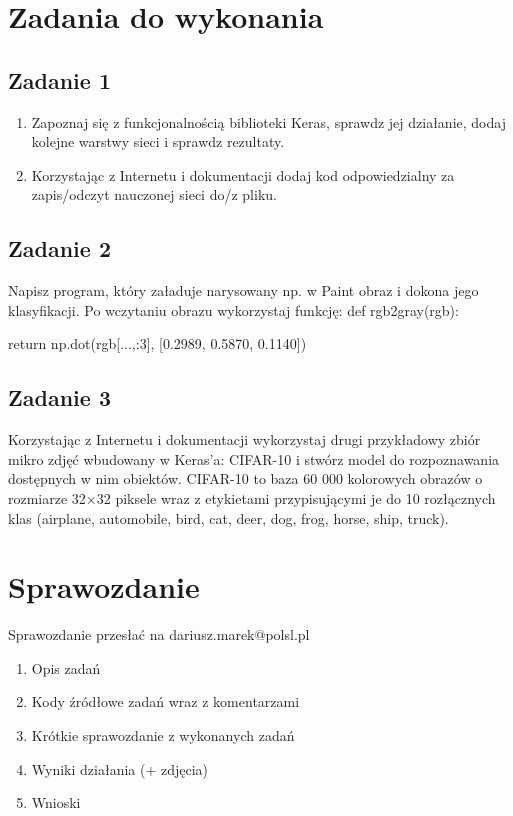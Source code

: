 \documentclass[12pt]{article}
\begin{document}
	\section{Zadania do wykonania}

	\subsection{Zadanie 1}
		\begin{enumerate}
			\item Zapoznaj się z funkcjonalnością biblioteki Keras, sprawdz jej działanie, dodaj kolejne warstwy sieci i sprawdz rezultaty.
			\item Korzystając z Internetu i dokumentacji dodaj kod odpowiedzialny za zapis/odczyt nauczonej sieci do/z pliku.
		\end{enumerate}
	
	\subsection{Zadanie 2}
		Napisz program, który załaduje narysowany np. w Paint obraz i dokona jego klasyfikacji.
		\newline
		\newline
		Po wczytaniu obrazu wykorzystaj funkcję: 
		\newline
		def rgb2gray(rgb):
			
			return np.dot(rgb[...,:3], [0.2989, 0.5870, 0.1140])
		
	\subsection{Zadanie 3}
		Korzystając z Internetu i dokumentacji wykorzystaj drugi przykładowy zbiór mikro zdjęć wbudowany w Keras'a: CIFAR-10 i stwórz model do rozpoznawania dostępnych w nim obiektów.
		\newline  CIFAR-10 to baza 60 000 kolorowych obrazów o rozmiarze 32×32 piksele wraz z etykietami przypisującymi je do 10 rozłącznych klas (airplane, automobile, bird, cat, deer, dog, frog, horse, ship, truck).
	
	\section{Sprawozdanie}
	Sprawozdanie przesłać na dariusz.marek@polsl.pl
	\begin{enumerate}
		\item Opis zadań
		\item Kody źródłowe zadań wraz z komentarzami
		\item Krótkie sprawozdanie z wykonanych zadań
		\item Wyniki działania (+ zdjęcia)
		\item Wnioski
	\end{enumerate}
\end{document}
